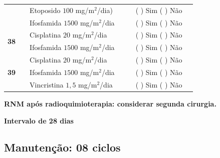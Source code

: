 \documentclass[11pt,a4paper,oldfontcommands]{memoir}
\begin{document}
\begin{center}
\begin{longtable}{p{1cm}c|p{4cm}|p{2cm}p{2cm}|c|c}
    \multicolumn{1}{c|}{}&&{Etoposido \(100\) mg/m\(^2\)/dia)}&&&{(  ) Sim (  ) Não}&\\
    \multicolumn{1}{c|}{}&&{Ifosfamida \(1500\) mg/m\(^2\)/dia}&&&{(  ) Sim (  ) Não}&\\
    \cline{2-3}\cline{6-6}
    \multicolumn{1}{c|}{\multirow{2}{*}{{\textbf{38}}}}&\multirow{2}{*}{}&{Cisplatina \(20\) mg/m\(^2\)/dia}&{}&&{(  ) Sim (  ) Não}&\\
    \multicolumn{1}{c|}{}&&{Ifosfamida \(1500\) mg/m\(^2\)/dia}&&&{(  ) Sim (  ) Não}&\\
    \cline{2-3}\cline{6-6}
    \multicolumn{1}{c|}{\multirow{3}{*}{\textbf{39}}}&\multirow{3}{*}{}&{Cisplatina \(20\) mg/m\(^2\)/dia}&{}&&{(  ) Sim (  ) Não}&\\
    \multicolumn{1}{c|}{}&&{Ifosfamida \(1500\) mg/m\(^2\)/dia}&&&{(  ) Sim (  ) Não}&\\
    \multicolumn{1}{c|}{}&&{Vincristina \(1,5\) mg/m\(^2\)/dia}&&&{(  ) Sim (  ) Não}&\\
    \hline
\end{longtable}
\textbf{RNM após radioquimioterapia: considerar segunda cirurgia.}

\textbf{Intervalo de 28 dias}
\end{center}
\clearpage
\subsection{Manutenção: 08 ciclos}
\end{document}
